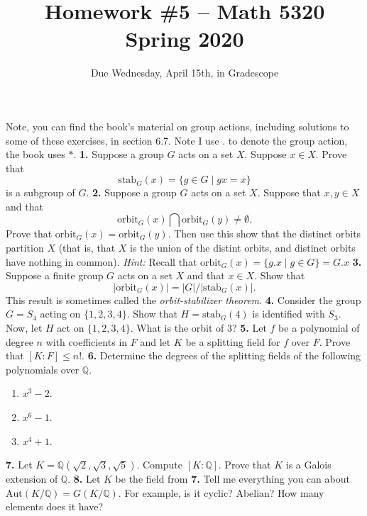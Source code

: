 \documentclass[10pt]{amsart}
\theoremstyle{theorem}
\newcommand{\bQ}{\mathbb{Q}}
\begin{document}
\title{Homework \#5 -- Math 5320\\Spring 2020}
\author{Due Wednesday, April 15th, in Gradescope}

\maketitle

Note, you can find the book's material on group actions, including solutions to some of these exercises, in section 6.7.  Note I use $.$ to denote the group action, the book uses $*$.  
\noindent
{\bf 1.}  Suppose a group $G$ acts on a set $X$.  Suppose $x \in X$.  Prove that
\[
    \mathrm{stab}_G(x) = \{g \in G\;|\; gx = x\}
\]
is a subgroup of $G$.  
\newpage
\noindent
{\bf 2.}  Suppose a group $G$ acts on a set $X$.  Suppose that $x,y \in X$ and that 
\[
    \mathrm{orbit}_G(x) \bigcap \mathrm{orbit}_G(y) \neq \emptyset.
\]
Prove that $\mathrm{orbit}_G(x) = \mathrm{orbit}_G(y)$.  Then use this show that the distinct orbits partition $X$ (that is, that $X$ is the union of the distint orbits, and distinct orbits have nothing in common).
\vskip 3pt
\emph{Hint:}  Recall that $\mathrm{orbit}_G(x) = \{g.x \;|\; g \in G\} = G.x$
\newpage
\noindent
{\bf 3.}  Suppose a finite group $G$ acts on a set $X$ and that $x \in X$.  Show that 
\[
    |\mathrm{orbit}_G(x)| = |G| / |\mathrm{stab}_G(x)|.
\]   
This result is sometimes called the \emph{orbit-stabilizer theorem}.
\newpage
\noindent
{\bf 4.}  Consider the group $G = S_4$ acting on $\{1, 2, 3, 4\}$.  Show that $H = \mathrm{stab}_G(4)$ is identified with $S_3$.  Now, let $H$ act on $\{1,2,3,4\}$.  What is the orbit of $3$?
\newpage
\noindent
{\bf 5.}  Let $f$ be a polynomial of degree $n$ with coefficients in $F$ and let $K$ be a splitting field for $f$ over $F$.  Prove that $[K : F] \leq n!$.
\newpage
\noindent
{\bf 6.}  Determine the degrees of the splitting fields of the following polynomials over $\bQ$.
\begin{enumerate}
    \item $x^3 - 2$.
    \item $x^6 - 1$.
    \item $x^4 + 1$.
\end{enumerate}
\newpage
\noindent
{\bf 7.}  Let $K = \bQ(\sqrt{2}, \sqrt{3}, \sqrt{5})$.  Compute $[K : \bQ]$.  Prove that $K$ is a Galois extension of $\bQ$.
\newpage
\noindent
{\bf 8.}  Let $K$ be the field from {\bf 7.}  Tell me everything you can about $\mathrm{Aut}(K/\bQ) = G(K/\bQ)$.  For example, is it cyclic? Abelian?  How many elements does it have?
\end{document}
